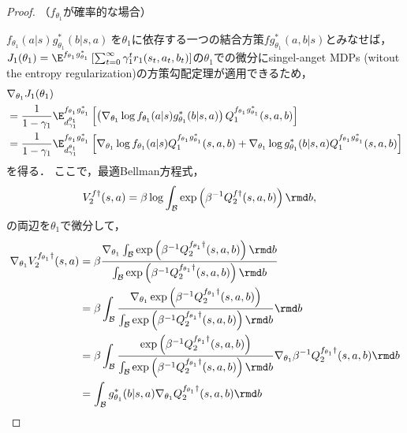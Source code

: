 \documentclass[a4paper,10pt,dvipdfmx]{jsarticle}
\begin{document}
\begin{proof}
（$f_{\theta_1}$が確率的な場合）

$f_{\theta_1}(a|s)g_{\theta_1}^*(b|s,a)~$を$\theta_1$に依存する一つの結合方策$fg_{\theta_1}^*(a,b|s)$とみなせば，$J_1(\theta_1)=\E^{f_{\theta_1}g_{\theta_1}^*}\left[\sum_{t=0}^\infty \gamma_1^tr_1(s_t,a_t,b_t)\right]$の$\theta_1$での微分にsingel-anget MDPs (witout the entropy regularization)の方策勾配定理が適用できるため，
\begin{subequations}
\begin{align}
    &\nabla_{\theta_1}J_1(\theta_1)\\
    &=\dfrac{1}{1-\gamma_1}\E_{d_{\gamma_1}^{\theta_1}}^{f_{\theta_1}g_{\theta_1}^*}\left[\left(\nabla_{\theta_1}\log f_{\theta_1}(a|s)g_{\theta_1}^*(b|s,a)\right)Q_1^{f_{\theta_1}g_{\theta_1}^*}(s,a,b)\right]\\
    &=\dfrac{1}{1-\gamma_1}\E_{d_{\gamma_1}^{\theta_1}}^{f_{\theta_1}g_{\theta_1}^*}\left[\nabla_{\theta_1}\log f_{\theta_1}(a|s)Q_1^{f_{\theta_1}g_{\theta_1}^*}(s,a,b)+\nabla_{\theta_1}\log g_{\theta_1}^*(b|s,a)Q_1^{f_{\theta_1}g_{\theta_1}^*}(s,a,b)\right]\label{eq:nabla_1_J_1_qr_bbf_first}
\end{align}
\end{subequations}
を得る．
ここで，最適Bellman方程式，
\begin{align}
    &V_2^{f\dag}(s,a)=\beta\log\int_{\mathcal{B}}\exp\left(\beta^{-1}Q_2^{f\dag}(s,a,b)\right)\rmd b,
\end{align}
の両辺を$\theta_1$で微分して，
\begin{subequations}
\begin{align}
    \nabla_{\theta_1}V_2^{f_{\theta_1}\dag}(s,a)&=\beta\dfrac{\nabla_{\theta_1}\int_{\mathcal{B}}\exp\left(\beta^{-1}Q_2^{f_{\theta_1}\dag}(s,a,b)\right)\rmd b}{\int_{\mathcal{B}}\exp\left(\beta^{-1}Q_2^{f_{\theta_1}\dag}(s,a,b)\right)\rmd b}\\
    &=\beta\int_{\mathcal{B}}\dfrac{\nabla_{\theta_1}\exp\left(\beta^{-1}Q_2^{f_{\theta_1}\dag}(s,a,b)\right)}{\int_{\mathcal{B}}\exp\left(\beta^{-1}Q_2^{f_{\theta_1}\dag}(s,a,b)\right)\rmd b}\rmd b\\
    &=\beta\int_{\mathcal{B}}\dfrac{\exp\left(\beta^{-1}Q_2^{f_{\theta_1}\dag}(s,a,b)\right)}{\int_{\mathcal{B}}\exp\left(\beta^{-1}Q_2^{f_{\theta_1}\dag}(s,a,b)\right)\rmd b}\nabla_{\theta_1}\beta^{-1}Q_2^{f_{\theta_1}\dag}(s,a,b)\rmd b\\
    &=\int_{\mathcal{B}}g_{\theta_1}^*(b|s,a)\nabla_{\theta_1}Q_2^{f_{\theta_1}\dag}(s,a,b)\rmd b\\

\end{align}
\end{subequations}
\end{proof}
\end{document}
